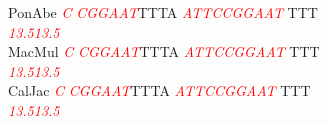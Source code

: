 \documentclass[11pt,twoside,reqno,a4paper]{article}
\begin{document}
{PonAbe	\textit{\textcolor{red}{C}}	\textit{\textcolor{red}{C}}\textit{\textcolor{red}{G}}\textit{\textcolor{red}{G}}\textit{\textcolor{red}{A}}\textit{\textcolor{red}{A}}\textit{\textcolor{red}{T}}TTTA	\textit{\textcolor{red}{A}}\textit{\textcolor{red}{T}}\textit{\textcolor{red}{T}}\textit{\textcolor{red}{C}}\textit{\textcolor{red}{C}}\textit{\textcolor{red}{G}}\textit{\textcolor{red}{G}}\textit{\textcolor{red}{A}}\textit{\textcolor{red}{A}}\textit{\textcolor{red}{T}}	TTT\\
\hspace*{7\charwidth}\hspace*{0\charwidth}\textit{\textcolor{red}{13.5}}\hspace*{1\charwidth}\hspace*{1\charwidth}\hspace*{7\charwidth}\textit{\textcolor{red}{13.5}}\hspace*{1\charwidth}\\
MacMul	\textit{\textcolor{red}{C}}	\textit{\textcolor{red}{C}}\textit{\textcolor{red}{G}}\textit{\textcolor{red}{G}}\textit{\textcolor{red}{A}}\textit{\textcolor{red}{A}}\textit{\textcolor{red}{T}}TTTA	\textit{\textcolor{red}{A}}\textit{\textcolor{red}{T}}\textit{\textcolor{red}{T}}\textit{\textcolor{red}{C}}\textit{\textcolor{red}{C}}\textit{\textcolor{red}{G}}\textit{\textcolor{red}{G}}\textit{\textcolor{red}{A}}\textit{\textcolor{red}{A}}\textit{\textcolor{red}{T}}	TTT\\
\hspace*{7\charwidth}\hspace*{0\charwidth}\textit{\textcolor{red}{13.5}}\hspace*{1\charwidth}\hspace*{1\charwidth}\hspace*{7\charwidth}\textit{\textcolor{red}{13.5}}\hspace*{1\charwidth}\\
CalJac	\textit{\textcolor{red}{C}}	\textit{\textcolor{red}{C}}\textit{\textcolor{red}{G}}\textit{\textcolor{red}{G}}\textit{\textcolor{red}{A}}\textit{\textcolor{red}{A}}\textit{\textcolor{red}{T}}TTTA	\textit{\textcolor{red}{A}}\textit{\textcolor{red}{T}}\textit{\textcolor{red}{T}}\textit{\textcolor{red}{C}}\textit{\textcolor{red}{C}}\textit{\textcolor{red}{G}}\textit{\textcolor{red}{G}}\textit{\textcolor{red}{A}}\textit{\textcolor{red}{A}}\textit{\textcolor{red}{T}}	TTT\\
\hspace*{7\charwidth}\hspace*{0\charwidth}\textit{\textcolor{red}{13.5}}\hspace*{1\charwidth}\hspace*{1\charwidth}\hspace*{7\charwidth}\textit{\textcolor{red}{13.5}}\hspace*{1\charwidth}\\
}
\end{document}
